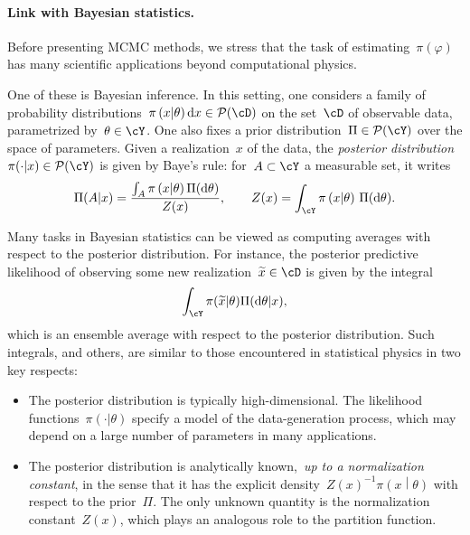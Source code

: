 \paragraph{Link with Bayesian statistics.}
Before presenting MCMC methods, we stress that the task of estimating~$\pi(\varphi)$ has many scientific applications beyond computational physics.

One of these is Bayesian inference. In this setting, one considers a family of probability distributions~$\pi\left(x\middle|\theta\right)\d x\in \mathcal P(\cD)$ on the set~$\cD$ of observable data, parametrized by~$\theta\in\cY$. One also fixes a prior distribution~$\Pi\in \mathcal P(\cY)$ over the space of parameters.
Given a realization~$x$ of the data, the \textit{posterior distribution}~$\pi(\cdot|x)\in\mathcal P(\cY)$ is given by Baye's rule: for~$A\subset\cY$ a measurable set, it writes
\begin{equation}
    \Pi(A|x) = \frac{\int_{A}\pi\left(x\middle|\theta\right)\Pi(\d\theta)}{Z(x)},\qquad Z(x) = \int_{\cY} \pi\left(x\middle|\theta\right)\,\Pi(\d\theta).
\end{equation}

Many tasks in Bayesian statistics can be viewed as computing averages with respect to the posterior distribution. For instance, the posterior predictive likelihood of observing some new realization~$\widetilde x\in\cD$ is given by the integral
\begin{equation}
    \int_{\cY} \pi(\widetilde x|\theta)\Pi(\d\theta|x),
\end{equation}
which is an ensemble average with respect to the posterior distribution. Such integrals, and others, are similar to those encountered in statistical physics in two key respects:
\begin{itemize}
    \item{The posterior distribution is typically high-dimensional. The likelihood functions~$\pi\left(\cdot|\theta\right)$ specify a model of the data-generation process, which may depend on a large number of parameters in many applications.}
    \item{The posterior distribution is analytically known,~\textit{up to a normalization constant}, in the sense that it has the explicit density~$Z(x)^{-1}\pi\left(x\middle|\theta\right)$ with respect to the prior~$\Pi$. The only unknown quantity is the normalization constant~$Z(x)$, which plays an analogous role to the partition function.}
\end{itemize}

